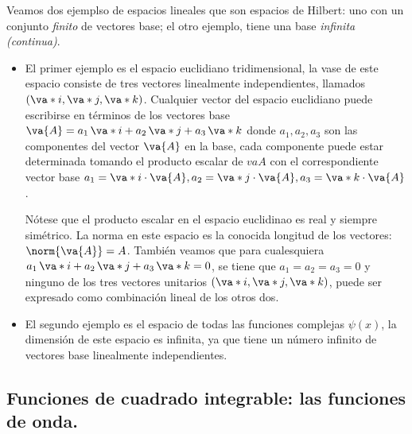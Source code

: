 Veamos dos ejemplso de espacios lineales que son espacios de Hilbert: uno con un conjunto \emph{finito} de vectores base; el otro ejemplo, tiene una base \emph{infinita (continua)}.
\begin{itemize}
\item El primer ejemplo es el espacio euclidiano tridimensional, la vase de este espacio consiste de tres vectores linealmente independientes, llamados $(\va*{i}, \va*{j}, \va*{k})$. Cualquier vector del espacio euclidiano puede escribirse en términos de los vectores base $\va{A} = a_{1} \, \va*{i} + a_{2} \, \va*{j} + a_{3} \, \va*{k}$ donde $a_{1}, a_{2}, a_{3}$ son las componentes del vector $\va{A}$ en la base, cada componente puede estar determinada tomando el producto escalar de $va{A}$ con el correspondiente vector base $a_{1} = \va*{i} \cdot \va{A}, a_{2} = \va*{j} \cdot \va{A}, a_{3} = \va*{k} \cdot \va{A}$.
\par
Nótese que el producto escalar en el espacio euclidinao es real y siempre simétrico. La norma en este espacio es la conocida longitud de los vectores: $\norm{\va{A}} = A$. También veamos que para cualesquiera $a_{1} \, \va*{i} + a_{2} \, \va*{j} + a_{3} \, \va*{k} = 0$, se tiene que $a_{1} = a_{2} = a_{3} = 0$ y ninguno de los tres vectores unitarios $(\va*{i}, \va*{j}, \va*{k})$, puede ser expresado como combinación lineal de los otros dos.
\item El segundo ejemplo es el espacio de todas las funciones complejas $\psi (x)$, la dimensión de este espacio es infinita, ya que tiene un número infinito de vectores base linealmente independientes.
\end{itemize}
\subsection{Funciones de cuadrado integrable: las funciones de onda.}

